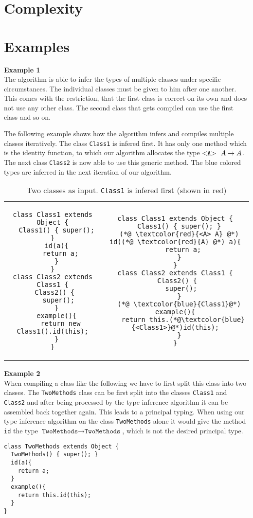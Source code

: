 \documentclass[runningheads]{llncs}
\begin{document}
\section{Complexity}


\section{Examples}

\textbf{Example 1}\\
The algorithm is able to infer the types of multiple classes under specific circumstances.
The individual classes must be given to him after one another.
This comes with the restriction, that the first class is correct on its own and does not use any other class.
The second class that gets compiled can use the first class and so on.

The following example shows how the algorithm infers and compiles multiple classes iteratively.
The class \texttt{Class1} is infered first.
It has only one method which is the identity function,
to which our algorithm allocates the type $\mathtt{ {\tt <} A {\tt >} \ }\ A \to A$.
The next class \texttt{Class2} is now able to use this generic method.
The blue colored types are inferred in the next iteration of our algorithm.

\begin{table}
\caption{Two classes as input. \texttt{Class1} is infered first (shown in {\color{red}red})}
\begin{tabular}{cc}
\begin{lstlisting}
class Class1 extends Object {
  Class1() { super(); }
  id(a){
    return a;
  }
}
class Class2 extends Class1 {
  Class2() { 
    super(); 
  }
  example(){
    return new Class1().id(this);
  }
}
\end{lstlisting}
&
\begin{lstlisting}
class Class1 extends Object {
  Class1() { super(); }
  (*@ \textcolor{red}{<A> A} @*) id((*@ \textcolor{red}{A} @*) a){
    return a;
  }
}
class Class2 extends Class1 {
  Class2() { 
    super(); 
  }
  (*@ \textcolor{blue}{Class1}@*) example(){
    return this.(*@\textcolor{blue}{<Class1>}@*)id(this);
  }
}
\end{lstlisting}
\end{tabular}
\end{table}

\textbf{Example 2}\\
When compiling a class like the following
we have to first split this class into two classes.
The \texttt{TwoMethods} class can be first split into the classes \texttt{Class1}
and \texttt{Class2} and after being processed by the type inference algorithm it can be assembled back together again.
This leads to a principal typing.
When using our type inference algorithm on the class \texttt{TwoMethods} alone
it would give the method \texttt{id} the type $\texttt{TwoMethods} \to \texttt{TwoMethods}$,
which is not the desired principal type.
\begin{lstlisting}
class TwoMethods extends Object {
  TwoMethods() { super(); }
  id(a){
    return a;
  }
  example(){
    return this.id(this);
  }
}
\end{lstlisting}
\end{document}

